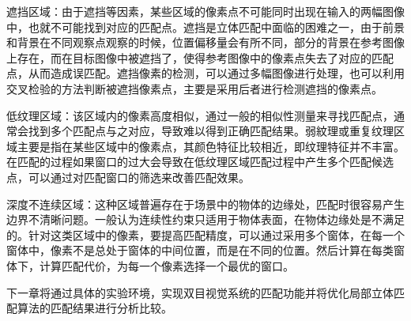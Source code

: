 遮挡区域：由于遮挡等因素，某些区域的像素点不可能同时出现在输入的两幅图像中，也就不可能找到对应的匹配点。遮挡是立体匹配中面临的困难之一，由于前景和背景在不同观察点观察的时候，位置偏移量会有所不同，部分的背景在参考图像上存在，而在目标图像中被遮挡了，使得参考图像中的像素点失去了对应的匹配点，从而造成误匹配。遮挡像素的检测，可以通过多幅图像进行处理，也可以利用交叉检验的方法判断被遮挡像素点，主要是采用后者进行检测遮挡的像素点。 

低纹理区域：该区域内的像素高度相似，通过一般的相似性测量来寻找匹配点，通常会找到多个匹配点与之对应，导致难以得到正确匹配结果。弱紋理或重复纹理区域主要是指在某些区域中的像素点，其颜色特征比较相近，即纹理特征并不丰富。在匹配的过程如果窗口的过大会导致在低纹理区域匹配过程中产生多个匹配候选点，可以通过对匹配窗口的筛选来改善匹配效果。

深度不连续区域：这种区域普遍存在于场景中的物体的边缘处，匹配时很容易产生边界不清晰问题。一般认为连续性约束只适用于物体表面，在物体边缘处是不满足的。针对这类区域中的像素，要提高匹配精度，可以通过采用多个窗体，在每一个窗体中，像素不是总处于窗体的中间位置，而是在不同的位置。然后计算在每类窗体下，计算匹配代价，为每一个像素选择一个最优的窗口。 

下一章将通过具体的实验环境，实现双目视觉系统的匹配功能并将优化局部立体匹配算法的匹配结果进行分析比较。
